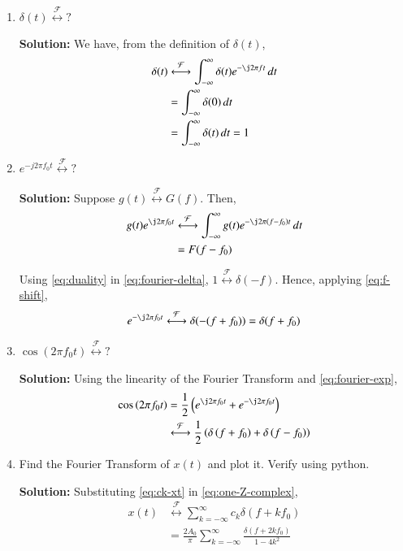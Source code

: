 \documentclass[journal,12pt,twocolumn]{IEEEtran}
\newcommand{\solution}{\noindent \textbf{Solution: }}
\providecommand{\brak}[1]{\ensuremath{\left(#1\right)}}
\providecommand{\system}[1]{\overset{\mathcal{#1}}{ \longleftrightarrow}}
\numberwithin{equation}{section}
\numberwithin{figure}{section}
\renewcommand\thesection{\arabic{section}}
\begin{document}
\begin{enumerate}[label=\thesection.\arabic*
,ref=\thesection.\theenumi]
\item $\delta(t)\system{F}?$

\solution We have, from the definition of $\delta(t)$,
\begin{align}
    \delta(t)&\system{F}\int_{-\infty}^{\infty}\delta(t)e^{-\j2\pi ft}\, dt \\
             &=\int_{-\infty}^{\infty}\delta(0)\, dt \\
             &=\int_{-\infty}^{\infty}\delta(t)\, dt = 1
             \label{eq:fourier-delta}
\end{align}

\item $e^{-j2\pi f_0t}\system{F}?$

\solution Suppose $g(t)\system{F}G(f)$. Then,
\begin{align}
    g(t)e^{\j2\pi f_0t}&\system{F}\int_{-\infty}^{\infty}
                       g(t)e^{-\j2\pi\brak{f-f_0}t}\, dt \\
                       &=F(f-f_0)
                       \label{eq:f-shift}
\end{align}

Using \eqref{eq:duality} in \eqref{eq:fourier-delta}, $1\system{F}\delta(-f)$.
Hence, applying \eqref{eq:f-shift},
\begin{align}
    e^{-\j2\pi f_0t}\system{F}\delta(-(f+f_0)) = \delta(f+f_0)
    \label{eq:fourier-exp}
\end{align}
\item $\cos(2\pi f_0t)\system{F}?$

\solution Using the linearity of the Fourier 
Transform and \eqref{eq:fourier-exp},
\begin{align}
    \cos\brak{2\pi f_0t} &= \frac{1}{2}
                         \brak{e^{\j2\pi f_0t} + e^{-\j2\pi f_0t}} \\
                         &\system{F}\frac{1}{2}\brak{\delta\brak{f+f_0} + \delta\brak{f-f_0}}
\end{align}

\item Find the Fourier Transform of $x(t)$ and plot it. Verify using python.

\solution Substituting \eqref{eq:ck-xt} in \eqref{eq:one-Z-complex},
\begin{align}
    x(t)&\system{F}\sum_{k=-\infty}^{\infty}c_k\delta\brak{f+kf_0} \\
        &=\frac{2A_0}{\pi}\sum_{k=-\infty}^{\infty}\frac{\delta\brak{f+2kf_0}}{1-4k^2}
        \label{eq:fourier-xt}
\end{align}


\end{enumerate}
\end{document}
